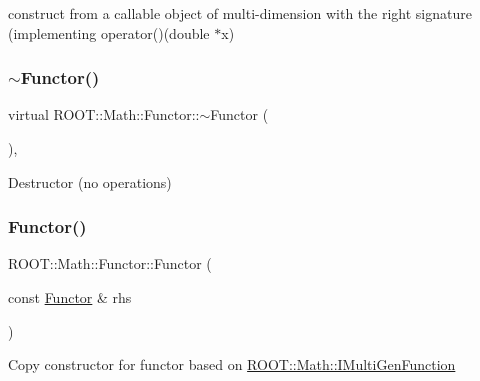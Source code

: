 construct from a callable object of multi-\/dimension with the right signature (implementing operator()(double $\ast$x) \mbox{\label{classROOT_1_1Math_1_1Functor_a349935f827a453deb17fdad728849028}} 
\subsubsection{\texorpdfstring{$\sim$Functor()}{~Functor()}\hspace{0.1cm}{\footnotesize\ttfamily [1/3]}}
{\footnotesize\ttfamily virtual R\+O\+O\+T\+::\+Math\+::\+Functor\+::$\sim$\+Functor (\begin{DoxyParamCaption}{ }\end{DoxyParamCaption})\hspace{0.3cm}{\ttfamily [inline]}, {\ttfamily [virtual]}}

Destructor (no operations) \mbox{\label{classROOT_1_1Math_1_1Functor_a001bfe27e95032f05685167e77e0efbd}} 
\subsubsection{\texorpdfstring{Functor()}{Functor()}\hspace{0.1cm}{\footnotesize\ttfamily [4/12]}}
{\footnotesize\ttfamily R\+O\+O\+T\+::\+Math\+::\+Functor\+::\+Functor (\begin{DoxyParamCaption}\item[{const \mbox{\hyperlink{classROOT_1_1Math_1_1Functor}{Functor}} \&}]{rhs }\end{DoxyParamCaption})\hspace{0.3cm}{\ttfamily [inline]}}

Copy constructor for functor based on \mbox{\hyperlink{namespaceROOT_1_1Math_aec22897f3d759f7c284893c81d980799}{R\+O\+O\+T\+::\+Math\+::\+I\+Multi\+Gen\+Function}} \mbox{\label{classROOT_1_1Math_1_1Functor_a2330648eca94b53b3ba613e49d03927f}} 
